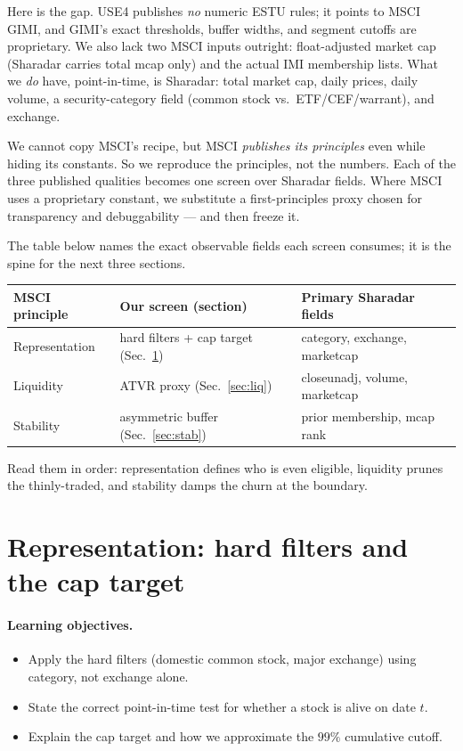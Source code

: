 \documentclass[11pt]{article}
\theoremstyle{definition}
\theoremstyle{plain}
\theoremstyle{remark}
\begin{document}
Here is the gap. USE4 publishes \emph{no} numeric ESTU rules; it points to MSCI GIMI, and GIMI's exact thresholds, buffer widths, and segment cutoffs are proprietary. We also lack two MSCI inputs outright: float-adjusted market cap (Sharadar carries total mcap only) and the actual IMI membership lists. What we \emph{do} have, point-in-time, is Sharadar: total market cap, daily prices, daily volume, a security-category field (common stock vs.\ ETF/CEF/warrant), and exchange.

\begin{intuition}
We cannot copy MSCI's recipe, but MSCI \emph{publishes its principles} even while hiding its constants. So we reproduce the principles, not the numbers. Each of the three published qualities becomes one screen over Sharadar fields. Where MSCI uses a proprietary constant, we substitute a first-principles proxy chosen for transparency and debuggability --- and then freeze it.
\end{intuition}

The table below names the exact observable fields each screen consumes; it is the spine for the next three sections.

\begin{center}
\small
\begin{tabular}{@{}lll@{}}
\toprule
MSCI principle & Our screen (section) & Primary Sharadar fields \\
\midrule
Representation & hard filters + cap target (Sec.\ \ref{sec:rep}) & category, exchange, marketcap \\
Liquidity & ATVR proxy (Sec.\ \ref{sec:liq}) & closeunadj, volume, marketcap \\
Stability & asymmetric buffer (Sec.\ \ref{sec:stab}) & prior membership, mcap rank \\
\bottomrule
\end{tabular}
\end{center}

Read them in order: representation defines who is even eligible, liquidity prunes the thinly-traded, and stability damps the churn at the boundary.

\section{Representation: hard filters and the cap target}\label{sec:rep}

\paragraph{Learning objectives.}
\begin{itemize}[nosep,leftmargin=1.4em]
  \item Apply the hard filters (domestic common stock, major exchange) using category, not exchange alone.
  \item State the correct point-in-time test for whether a stock is alive on date $t$.
  \item Explain the cap target and how we approximate the $99\%$ cumulative cutoff.
\end{itemize}
\end{document}
